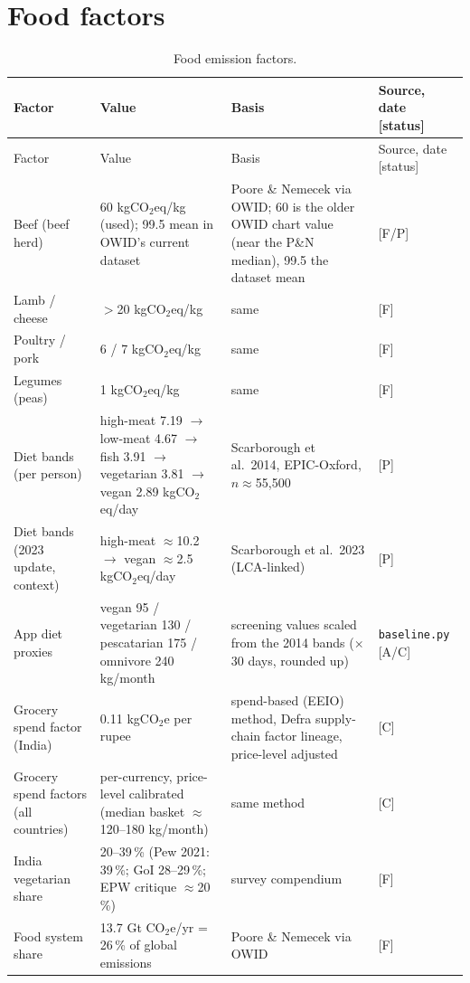 \documentclass[11pt,a4paper]{article}
\begin{document}
\section{Food factors}
\label{sec:food}

\begin{longtable}{@{}p{4.6cm}p{3.4cm}p{4.6cm}p{3.6cm}@{}}
\caption{Food emission factors.}\label{tab:food}\\
\toprule
Factor & Value & Basis & Source, date [status] \\
\midrule
\endfirsthead
\toprule
Factor & Value & Basis & Source, date [status] \\
\midrule
\endhead
Beef (beef herd) & 60 kgCO$_2$eq/kg (used); 99.5 mean in OWID's current dataset & Poore \& Nemecek via OWID; 60 is the older OWID chart value (near the P\&N median), 99.5 the dataset mean & \cite{owid_food_choice, owid_food_methane, poore2018} [F/P] \\
Lamb / cheese & $>$20 kgCO$_2$eq/kg & same & \cite{owid_food_choice} [F] \\
Poultry / pork & 6 / 7 kgCO$_2$eq/kg & same & \cite{owid_food_choice} [F] \\
Legumes (peas) & 1 kgCO$_2$eq/kg & same & \cite{owid_food_choice} [F] \\
Diet bands (per person) & high-meat 7.19 $\rightarrow$ low-meat 4.67 $\rightarrow$ fish 3.91 $\rightarrow$ vegetarian 3.81 $\rightarrow$ vegan 2.89 kgCO$_2$eq/day & Scarborough et al.\ 2014, EPIC-Oxford, $n\approx$55{,}500 & \cite{scarborough2014} [P] \\
Diet bands (2023 update, context) & high-meat $\approx$10.2 $\rightarrow$ vegan $\approx$2.5 kgCO$_2$eq/day & Scarborough et al.\ 2023 (LCA-linked) & \cite{scarborough2023} [P] \\
App diet proxies & vegan 95 / vegetarian 130 / pescatarian 175 / omnivore 240 kg/month & screening values scaled from the 2014 bands ($\times$30 days, rounded up) & \texttt{baseline.py} [A/C] \\
Grocery spend factor (India) & 0.11 kgCO$_2$e per rupee & spend-based (EEIO) method, Defra supply-chain factor lineage, price-level adjusted & \cite{defra2011} [C] \\
Grocery spend factors (all countries) & per-currency, price-level calibrated (median basket $\approx$120--180 kg/month) & same method & \cite{defra2011} [C] \\
India vegetarian share & 20--39\,\% (Pew 2021: 39\,\%; GoI 28--29\,\%; EPW critique $\approx$20\,\%) & survey compendium & \cite{wiki_veg_india} [F] \\
Food system share & 13.7 Gt CO$_2$e/yr = 26\,\% of global emissions & Poore \& Nemecek via OWID & \cite{owid_opportunity, poore2018} [F] \\
\bottomrule
\end{longtable}
\end{document}
